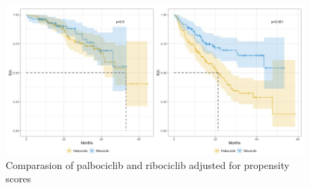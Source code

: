 \begin{figure}[ht]
  \centering

  \caption{Comparasion of palbociclib and ribociclib adjusted for propensity scores  }\label{fig:propensity} 
  \includegraphics[scale=0.35]{figures/propensity_score_both.jpeg}%

\end{figure}
